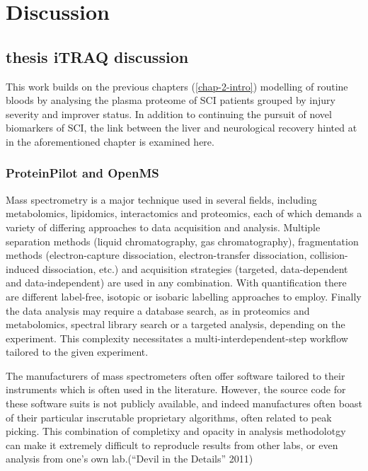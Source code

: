 \documentclass[9pt,lineno]{elife}
\begin{document}
\hypertarget{discussion}{%
\section{Discussion}\label{discussion}}

\hypertarget{thesis-itraq-discussion}{%
\subsection{thesis iTRAQ discussion}\label{thesis-itraq-discussion}}

This work builds on the previous chapters (\ref{chap-2-intro}) modelling of routine bloods by analysing the plasma proteome of SCI patients grouped by injury severity and improver status.
In addition to continuing the pursuit of novel biomarkers of SCI, the link between the liver and neurological recovery hinted at in the aforementioned chapter is examined here.

\hypertarget{proteinpilot-and-openms}{%
\subsubsection{ProteinPilot and OpenMS}\label{proteinpilot-and-openms}}

Mass spectrometry is a major technique used in several fields, including metabolomics, lipidomics, interactomics and proteomics, each of which demands a variety of differing approaches to data acquisition and analysis.
Multiple separation methods (liquid chromatography, gas chromatography), fragmentation methods (electron-capture dissociation, electron-transfer dissociation, collision-induced dissociation, etc.) and acquisition strategies (targeted, data-dependent and data-independent) are used in any combination.
With quantification there are different label-free, isotopic or isobaric labelling approaches to employ.
Finally the data analysis may require a database search, as in proteomics and metabolomics, spectral library search or a targeted analysis, depending on the experiment.
This complexity necessitates a multi-interdependent-step workflow tailored to the given experiment.

The manufacturers of mass spectrometers often offer software tailored to their instruments which is often used in the literature.
However, the source code for these software suits is not publicly available, and indeed manufactures often boast of their particular inscrutable proprietary algorithms, often related to peak picking.
This combination of completixy and opacity in analysis methodolotgy can make it extremely difficult to reproducle results from other labs, or even analysis from one's own lab.({``Devil in the Details''} 2011)
\end{document}
